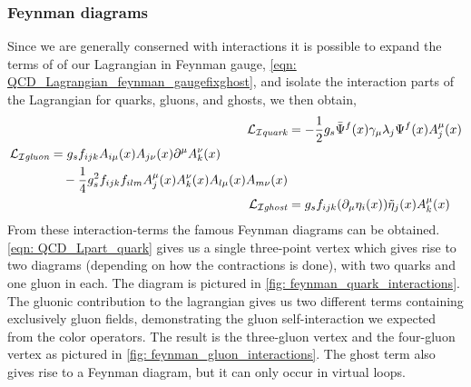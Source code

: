 \documentclass[main.tex]{subfiles}
\begin{document}
\subsubsection*{Feynman diagrams}
Since we are generally conserned with interactions it is possible to expand the terms of of our Lagrangian in Feynman gauge, \autoref{eqn: QCD_Lagrangian_feynman_gaugefixghost}, and isolate the interaction parts of the Lagrangian for quarks, gluons, and ghosts, we then obtain,
\begin{align}
    \mathcal{L}_{\mathcal{I}\textit{quark}} &= - \frac{1}{2} g_s \bar \Psi^f(x) \gamma_\mu \lambda_j \Psi^f(x) A_j^\mu (x) \label{eqn: QCD_Lpart_quark}  \\
    \begin{split}
    \mathcal{L}_{\mathcal{I}\textit{gluon}} &= g_s f_{ijk} A_{i\mu}(x)A_{j\nu}(x) \partial^\mu A_k^\nu(x) \\
    &\quad - \frac{1}{4} g_s^2 f_{ijk} f_{ilm} A_j^\mu(x) A_k^\nu(x) A_{l\mu}(x) A_{m\nu}(x) \label{eqn: QCD_Lpart_gluon} \end{split} \\
    \mathcal{L}_{\mathcal{I}\textit{ghost}} &= g_s f_{ijk} (\partial_\mu \eta_i(x)) \Tilde{\eta}_j(x) A_k^\mu(x) \label{eqn: QCD_Lpart_ghost} 
\end{align}
From these interaction-terms the famous Feynman diagrams can be obtained. \autoref{eqn: QCD_Lpart_quark} gives us a single three-point vertex which gives rise to two diagrams (depending on how the contractions is done), with two quarks and one gluon in each. The diagram is pictured in \autoref{fig: feynman_quark_interactions}. The gluonic contribution to the lagrangian gives us two different terms containing exclusively gluon fields, demonstrating the gluon self-interaction we expected from the color operators. The result is the three-gluon vertex and the four-gluon vertex as pictured in \autoref{fig: feynman_gluon_interactions}. The ghost term also gives rise to a Feynman diagram, but it can only occur in virtual loops.
\end{document}
